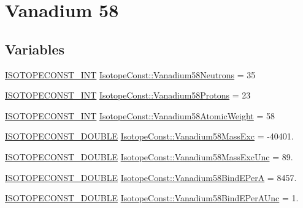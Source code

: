 \hypertarget{group___isotope_const-_vanadium-_v58}{}\section{Vanadium 58}
\label{group___isotope_const-_vanadium-_v58}
\subsection*{Variables}
\begin{DoxyCompactItemize}
\item 
\mbox{\hyperlink{group___isotope_const-_macros_ga5f18360b3e99483a35c32d789e62621c}{I\+S\+O\+T\+O\+P\+E\+C\+O\+N\+S\+T\+\_\+\+I\+NT}} \mbox{\hyperlink{group___isotope_const-_vanadium-_v58_gaabb58e3deb7845b606c3a8d856bfe3ab}{Isotope\+Const\+::\+Vanadium58\+Neutrons}} = 35
\item 
\mbox{\hyperlink{group___isotope_const-_macros_ga5f18360b3e99483a35c32d789e62621c}{I\+S\+O\+T\+O\+P\+E\+C\+O\+N\+S\+T\+\_\+\+I\+NT}} \mbox{\hyperlink{group___isotope_const-_vanadium-_v58_ga9550b6b7f7a330d927fb48d80f4f07ae}{Isotope\+Const\+::\+Vanadium58\+Protons}} = 23
\item 
\mbox{\hyperlink{group___isotope_const-_macros_ga5f18360b3e99483a35c32d789e62621c}{I\+S\+O\+T\+O\+P\+E\+C\+O\+N\+S\+T\+\_\+\+I\+NT}} \mbox{\hyperlink{group___isotope_const-_vanadium-_v58_gac67c6039e7a7aa24cbeda8ad0d1bf058}{Isotope\+Const\+::\+Vanadium58\+Atomic\+Weight}} = 58
\item 
\mbox{\hyperlink{group___isotope_const-_macros_ga8f45a7272ce02c0b4c65c44636ed719a}{I\+S\+O\+T\+O\+P\+E\+C\+O\+N\+S\+T\+\_\+\+D\+O\+U\+B\+LE}} \mbox{\hyperlink{group___isotope_const-_vanadium-_v58_ga4f525e1608beda5159d9d7eadc62f8fb}{Isotope\+Const\+::\+Vanadium58\+Mass\+Exc}} = -\/40401.
\item 
\mbox{\hyperlink{group___isotope_const-_macros_ga8f45a7272ce02c0b4c65c44636ed719a}{I\+S\+O\+T\+O\+P\+E\+C\+O\+N\+S\+T\+\_\+\+D\+O\+U\+B\+LE}} \mbox{\hyperlink{group___isotope_const-_vanadium-_v58_ga512f4422fd84092bb99bcbb271d6c25e}{Isotope\+Const\+::\+Vanadium58\+Mass\+Exc\+Unc}} = 89.
\item 
\mbox{\hyperlink{group___isotope_const-_macros_ga8f45a7272ce02c0b4c65c44636ed719a}{I\+S\+O\+T\+O\+P\+E\+C\+O\+N\+S\+T\+\_\+\+D\+O\+U\+B\+LE}} \mbox{\hyperlink{group___isotope_const-_vanadium-_v58_ga715642eb1f72cade7f346482cab0ed28}{Isotope\+Const\+::\+Vanadium58\+Bind\+E\+PerA}} = 8457.
\item 
\mbox{\hyperlink{group___isotope_const-_macros_ga8f45a7272ce02c0b4c65c44636ed719a}{I\+S\+O\+T\+O\+P\+E\+C\+O\+N\+S\+T\+\_\+\+D\+O\+U\+B\+LE}} \mbox{\hyperlink{group___isotope_const-_vanadium-_v58_ga47b760d5a61f16d059ba35b6cbb79a10}{Isotope\+Const\+::\+Vanadium58\+Bind\+E\+Per\+A\+Unc}} = 1.

\end{DoxyCompactItemize}
